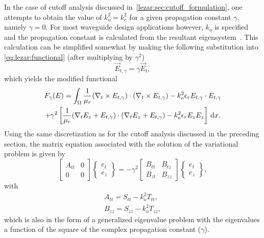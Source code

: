 In the case of cutoff analysis discussed
in~\ref{lezar:sec:cutoff_formulation}, one attempts to obtain the value
of $k_o^2 = k_c^2$ for a given propagation constant $\gamma$, namely
$\gamma = 0$.  For most waveguide design applications however, $k_o$ is
specified and the propagation constant is calculated from the resultant
eigensystem~\citep{Jin2002, PelosiCoccioliSelleri1998}. This calculation
can be simplified somewhat by making the following substitution into
\eqref{eq:lezar:functional} (after multiplying by
$\gamma^2$)
\begin{equation}
    \vec{E}_{t,\gamma} = \gamma\vec{E}_t,
\end{equation}
which yields the modified functional
\begin{multline}
    \label{eq:lezar:functional_scaled}
    F_\gamma({E}) =
    \int_{\Omega}\frac{1}{\mu_r}(\nabla_t\times{\ensuremath{{E}}_{t,\gamma}})\cdot(\nabla_t\times{\ensuremath{{E}}_{t,\gamma}}) -k_o^2\epsilon_r{E}_{t,\gamma}\cdot{\ensuremath{{E}}_{t,\gamma}}\\
    +\gamma^2\left[\frac{1}{\mu_r}(\nabla_t{E_z} +
    {E}_{t,\gamma})\cdot(\nabla_t{E_z} + {E}_{t,\gamma})-k_o^2\epsilon_r
    E_z{E_z}\right] \, \mathrm{d}x.
\end{multline}
Using the same discretization as for the cutoff analysis discussed in
the preceding section, the matrix equation associated with the solution
of the variational problem is given by~\citep{PelosiCoccioliSelleri1998}
\begin{equation}
    \label{eq:lezar:matrix_equation_dispersion}
    \begin{bmatrix} A_{tt} & 0\\0 & 0\end{bmatrix}\begin{Bmatrix}e_t\\e_z\end{Bmatrix}
    =
    -\gamma^2\begin{bmatrix} B_{tt} & B_{tz}\\B_{zt} &
    B_{zz}\end{bmatrix}\begin{Bmatrix}e_t\\e_z\end{Bmatrix},
\end{equation}
with
\begin{align}
    \label{eq:lezar:A_tt}
    A_{tt} = S_{tt} - k_o^2 T_{tt},\\
    \label{eq:lezar:B_zz}
    B_{zz} = S_{zz} - k_o^2 T_{zz},
\end{align}
which is also in the form of a generalized eigenvalue
problem with the eigenvalues a function of
the square of the complex propagation constant ($\gamma$).

